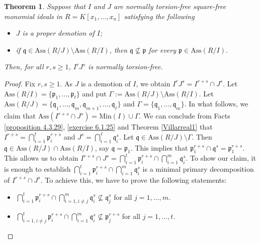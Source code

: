 \documentclass[11pt]{amsart}
\newtheorem{theorem}{Theorem}[section]
\begin{document}
\begin{theorem} \label{NTT-1}
Suppose that  $I$ and $J$  are  normally torsion-free square-free monomial ideals in $R=K[x_1, \ldots, x_n]$ satisfying the following
\begin{itemize}
\item[(i)] $J$ is a proper demotion of $I$;
\item[(ii)] if $\mathfrak{q} \in \mathrm{Ass}(R/J)\setminus \mathrm{Ass}(R/I)$, then  $\mathfrak{q} \nsubseteq \mathfrak{p}$ for every 
$\mathfrak{p}\in \mathrm{Ass}(R/I).$ 
\end{itemize}
 Then, for all $r,s \geq 1$, $I^rJ^s$ is normally torsion-free. 
\end{theorem}

\begin{proof}
Fix $r,s \geq 1$.  As  $J$ is a demotion of $I$, we obtain    $I^rJ^s=I^{r+s}\cap J^s$.  Let  $\mathrm{Ass}(R/I)=\{\mathfrak{p}_1, \ldots,   \mathfrak{p}_t\}$ and
 put $\Gamma:=\mathrm{Ass}(R/J)\setminus \mathrm{Ass}(R/I)$. 
 Let   $\mathrm{Ass}(R/J)=\{\mathfrak{q}_1, \ldots,   \mathfrak{q}_m, \mathfrak{q}_{m+1}, \ldots,   \mathfrak{q}_\ell\}$ and 
 $\Gamma=\{\mathfrak{q}_1, \ldots, \mathfrak{q}_m\}.$ 
In what follows, we claim that $\mathrm{Ass}(I^{r+s}\cap J^s)=\mathrm{Min}(I) \cup \Gamma$. 
We can conclude from   Facts \ref{proposition 4.3.29}, \ref{exercise 6.1.25} and Theorem \ref{Villarreal1}  that  $I^{r+s}=\bigcap_{i=1}^{t}{\mathfrak{p}^{r+s}_i}$ 
  and  $J^s=\bigcap_{i=1}^{\ell}\mathfrak{q}_i^s$. Let $\mathfrak{q}\in \mathrm{Ass}(R/J)\setminus  \Gamma$. Then $\mathfrak{q}\in \mathrm{Ass}(R/J)\cap  \mathrm{Ass}(R/I)$, 
  say $\mathfrak{q}=\mathfrak{p}_1$. This implies that $\mathfrak{p}_1^{r+s} \cap \mathfrak{q}^s=\mathfrak{p}_1^{r+s}$. This allows us to obtain  
   $I^{r+s} \cap J^s=\bigcap_{i=1}^{t}{\mathfrak{p}^{r+s}_i} \cap \bigcap_{i=1}^{m}\mathfrak{q}_i^s$. To show our claim, it is enough to establish 
  $\bigcap_{i=1}^{t}{\mathfrak{p}^{r+s}_i} \cap \bigcap_{i=1}^{m}\mathfrak{q}_i^s$ is a minimal primary decomposition of 
   $I^{r+s} \cap J^s$. To achieve this, we have to 
  prove the following statements:
  \begin{itemize}
  \item[(i)]  $\bigcap_{i=1}^{t}{\mathfrak{p}^{r+s}_i}\cap  \bigcap_{i=1,i\neq j}^{m}{\mathfrak{q}^{s}_i} \nsubseteq   \mathfrak{q}_j^s$ 
  for all $j=1, \ldots, m$. 
  \item[(ii)]  $\bigcap_{i=1,i\neq j}^{t}{\mathfrak{p}^{r+s}_i}\cap   \bigcap_{i=1}^{m}{\mathfrak{q}^{s}_i}    \nsubseteq \mathfrak{p}^{r+s}_j$
   for all $j=1, \ldots, t$. 
    \end{itemize}
  

\end{proof}
\end{document}

